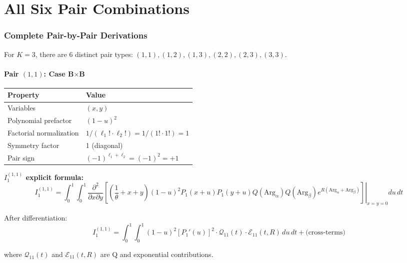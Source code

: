 \documentclass[11pt]{article}
\begin{document}
\part{All Six Pair Combinations}

\section{Complete Pair-by-Pair Derivations}
\label{sec:pairs}

For $K=3$, there are 6 distinct pair types: $(1,1), (1,2), (1,3), (2,2), (2,3), (3,3)$.

\subsection{Pair $(1,1)$: Case B$\times$B}

\begin{center}
\begin{tabular}{ll}
\toprule
Property & Value \\
\midrule
Variables & $(x, y)$ \\
Polynomial prefactor & $(1-u)^2$ \\
Factorial normalization & $1/(\ell_1! \cdot \ell_2!) = 1/(1! \cdot 1!) = 1$ \\
Symmetry factor & 1 (diagonal) \\
Pair sign & $(-1)^{\ell_1+\ell_2} = (-1)^2 = +1$ \\
\bottomrule
\end{tabular}
\end{center}

\textbf{$I_1^{(1,1)}$ explicit formula:}
\begin{equation}
I_1^{(1,1)} = \int_0^1 \int_0^1 \left.\frac{\partial^2}{\partial x \partial y}\left[\left(\frac{1}{\theta} + x + y\right) (1-u)^2 P_1(x+u) P_1(y+u) Q(\text{Arg}_\alpha) Q(\text{Arg}_\beta) e^{R(\text{Arg}_\alpha + \text{Arg}_\beta)}\right]\right|_{x=y=0} du\, dt
\end{equation}

After differentiation:
\begin{equation}
I_1^{(1,1)} = \int_0^1 \int_0^1 (1-u)^2 \left[P_1'(u)\right]^2 \cdot \mathcal{Q}_{11}(t) \cdot \mathcal{E}_{11}(t, R) \, du\, dt + \text{(cross-terms)}
\end{equation}

where $\mathcal{Q}_{11}(t)$ and $\mathcal{E}_{11}(t, R)$ are Q and exponential contributions.
\end{document}
